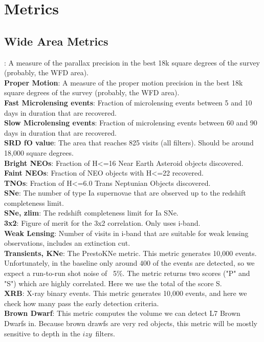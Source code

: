 \section{Metrics}



\subsection{Wide Area Metrics}

: A measure of the parallax precision in the best 18k square degrees of the survey (probably, the WFD area).  \\
{\bf Proper Motion}: A measure of the proper motion precision in the best 18k square degrees of the survey (probably, the WFD area). \\
{\bf Fast Microlensing events}: Fraction of microlensing events between 5 and 10 days in duration that are recovered. \\
{\bf Slow Microlensing events}: Fraction of microlensing events between 60 and 90 days in duration that are recovered.\\
{\bf SRD fO value}: The area that reaches 825 visits (all filters). Should be around 18,000 square degrees. \\
{\bf Bright NEOs}: Fraction of H<=16 Near Earth Asteroid objects discovered. \\
{\bf Faint NEOs}: Fraction of NEO objects with H<=22 recovered.  \\
{\bf TNOs}: Fraction of H<=6.0 Trans Neptunian Objects discovered.  \\
{\bf SNe}: The number of type Ia supernovae that are observed up to the redshift completeness limit. \\
{\bf SNe, zlim}: The redshift completeness limit for Ia SNe. \\
{\bf 3x2}: Figure of merit for the 3x2 correlation. Only uses i-band. \\
{\bf Weak Lensing}: Number of visits in i-band that are suitable for weak lensing observations, includes an extinction cut. \\
{\bf Transients, KNe}: The PrestoKNe metric. This metric generates 10,000 events. Unfortunately, in the baseline only around 400 of the events are detected, so we expect a run-to-run shot noise of ~5\%. The metric returns two scores ("P" and "S") which are highly correlated. Here we use the total of the score S.  \\
{\bf XRB}: X-ray binary events. This metric generates 10,000 events, and here we check how many pass the early detection criteria. \\
{\bf Brown Dwarf}:  This metric computes the volume we can detect L7 Brown Dwarfs in. Because brown drawfs are very red objects, this metric will be mostly sensitive to depth in the $izy$\ filters.\\

